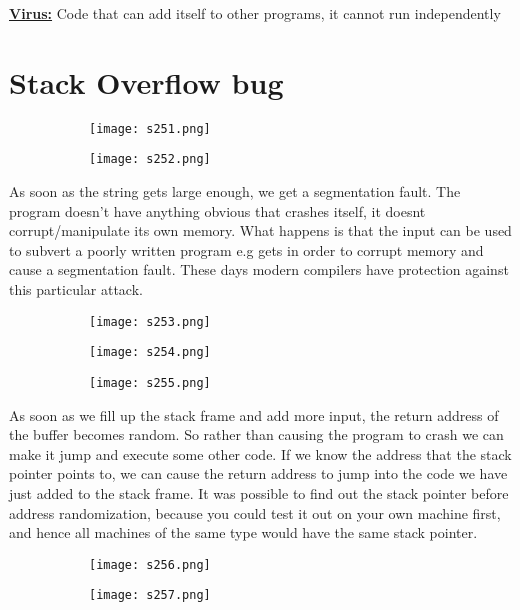 \documentclass[8pt]{extreport}
\begin{document}
\underline{\textbf{Virus:}} Code that can add itself to other programs, it cannot run independently

\section{Stack Overflow bug}
\begin{figure}[H]
\centering
\begin{subfigure}[b]{0.4\linewidth}
\texttt{[image: s251.png]}
\end{subfigure}
\begin{subfigure}[b]{0.4\linewidth}
\texttt{[image: s252.png]}
\end{subfigure}
\end{figure}
As soon as the string gets large enough, we get a segmentation fault. The program doesn't have anything obvious that crashes itself, it doesnt corrupt/manipulate its own memory. What happens is that the input can be used to subvert a poorly written program e.g gets in order to corrupt memory and cause a segmentation fault. These days modern compilers have protection against this particular attack.
\begin{figure}[H]
\centering
\begin{subfigure}[b]{0.4\linewidth}
\texttt{[image: s253.png]}
\end{subfigure}
\begin{subfigure}[b]{0.4\linewidth}
\texttt{[image: s254.png]}
\end{subfigure}
\begin{subfigure}[b]{0.4\linewidth}
\texttt{[image: s255.png]}
\end{subfigure}
\end{figure}
As soon as we fill up the stack frame and add more input, the return address of the buffer becomes random. So rather than causing the program to crash we can make it jump and execute some other code. If we know the address that the stack pointer points to, we can cause the return address to jump into the code we have just added to the stack frame. It was possible to find out the stack pointer before address randomization, because you could test it out on your own machine first, and hence all machines of the same type would have the same stack pointer.
\begin{figure}[H]
\centering
\begin{subfigure}[b]{0.4\linewidth}
\texttt{[image: s256.png]}
\end{subfigure}
\begin{subfigure}[b]{0.4\linewidth}
\texttt{[image: s257.png]}
\end{subfigure}
\end{figure}
\end{document}
